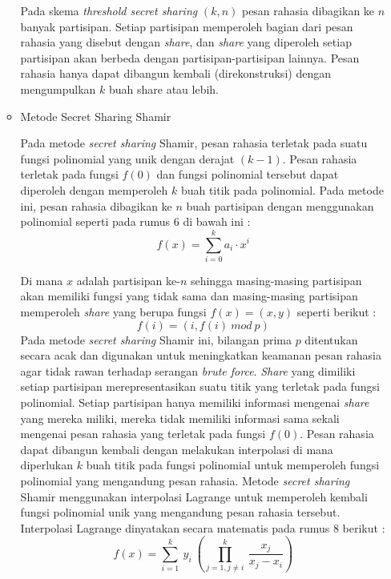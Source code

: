 \documentclass[a4paper,twoside]{article}
\begin{document}
\begin{enumerate}
\begin{itemize}
\vspace{10pt}

Pada skema \textit{threshold secret sharing} $(k,n)$ pesan rahasia dibagikan ke $n$ banyak partisipan. Setiap partisipan memperoleh bagian dari pesan rahasia yang disebut dengan \textit{share}, dan \textit{share} yang diperoleh setiap partisipan akan berbeda dengan partisipan-partisipan lainnya. Pesan rahasia hanya dapat dibangun kembali (direkonstruksi) dengan mengumpulkan $k$ buah share atau lebih. \\

\item Metode Secret Sharing Shamir 

Pada metode \textit{secret sharing} Shamir, pesan rahasia terletak pada suatu fungsi polinomial yang unik dengan derajat $(k-1)$. Pesan rahasia terletak pada fungsi $f(0)$ dan fungsi polinomial tersebut dapat diperoleh dengan memperoleh $k$ buah titik pada polinomial. Pada metode ini, pesan rahasia dibagikan ke $n$ buah partisipan dengan menggunakan polinomial seperti pada rumus 6 di bawah ini :
\begin{equation}
f(x) = \sum_{i=0}^{k} a_{i} \cdot x^{i}
\end{equation}

Di mana $x$ adalah partisipan ke-$n$ sehingga masing-masing partisipan akan memiliki fungsi yang tidak sama dan masing-masing partisipan memperoleh \textit{share} yang berupa fungsi $f(x) = (x,y)$ seperti berikut :
\begin{equation}
f(i) = (i,f(i) \ mod \ p)
\end{equation}
Pada metode \textit{secret sharing} Shamir ini, bilangan prima $p$ ditentukan secara acak dan digunakan untuk meningkatkan keamanan pesan rahasia agar tidak rawan terhadap serangan \textit{brute force}. \textit{Share} yang dimiliki setiap partisipan merepresentasikan suatu titik yang terletak pada fungsi polinomial. Setiap partisipan hanya memiliki informasi mengenai \textit{share} yang mereka miliki, mereka tidak memiliki informasi sama sekali mengenai pesan rahasia yang terletak pada fungsi $f(0)$. Pesan rahasia dapat dibangun kembali dengan melakukan interpolasi di mana diperlukan $k$ buah titik pada fungsi polinomial untuk memperoleh fungsi polinomial yang mengandung pesan rahasia. Metode \textit{secret sharing} Shamir menggunakan interpolasi Lagrange untuk memperoleh kembali fungsi polinomial unik yang mengandung pesan rahasia tersebut. Interpolasi Lagrange dinyatakan secara matematis pada rumus 8 berikut :
\begin{equation}
f(x) = \sum_{i=1}^{k} \ y_{i} \ \left( \prod_{j=1,j \neq i}^k \ \frac{x_{j}}{x_{j}-x_{i}} \right)
\end{equation}


\end{itemize}
\end{enumerate}
\end{document}
